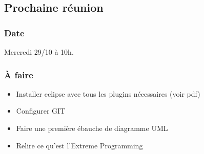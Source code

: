 \documentclass[12pt,a4paper]{article}
\begin{document}
	\subsection{Prochaine réunion}
		\subsubsection{Date}
			Mercredi 29/10 à 10h.
		\subsubsection{À faire}
			\begin{itemize}
				\item Installer eclipse avec tous les plugins nécessaires (voir pdf)
				\item Configurer GIT
				\item Faire une première ébauche de diagramme UML
				\item Relire ce qu'est l'Extreme Programming
			\end{itemize}
\end{document}
